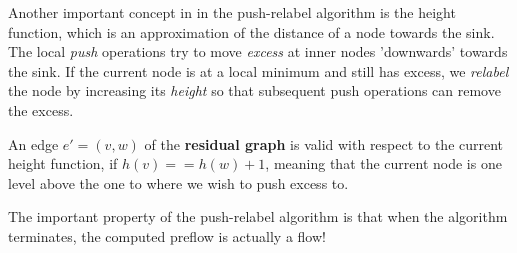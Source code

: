 Another important concept in in the push-relabel algorithm is the height function, which is an approximation of the distance of a node towards the sink. The local \textit{push} operations try to move \textit{excess} at inner nodes 'downwards' towards the sink. If the current node is at a local minimum and still has excess, we \textit{relabel} the node by increasing its \textit{height} so that subsequent push operations can remove the excess.
\begin{definition}
	An edge $e'=(v,w)$ of the \textbf{residual graph} is valid with respect to the current height function, if $h(v)==h(w)+1$, meaning that the current node is one level above the one to where we wish to push excess to.
\end{definition}

The important property of the push-relabel algorithm is that when the algorithm terminates, the computed preflow is actually a flow!




